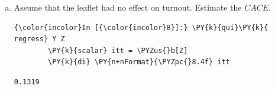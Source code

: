 \documentclass[11pt,notitlepage]{article}\usepackage[]{graphicx}\usepackage[]{color}
\makeatletter
\newenvironment{kframe}{%
 \def\at@end@of@kframe{}%
 \ifinner\ifhmode%
  \def\at@end@of@kframe{\end{minipage}}%
  \begin{minipage}{\columnwidth}%
 \fi\fi%
 \def\FrameCommand##1{\hskip\@totalleftmargin \hskip-\fboxsep
 \colorbox{shadecolor}{##1}\hskip-\fboxsep
     \hskip-\linewidth \hskip-\@totalleftmargin \hskip\columnwidth}%
 \MakeFramed {\advance\hsize-\width
   \@totalleftmargin\z@ \linewidth\hsize
   \@setminipage}}%
 {\par\unskip\endMakeFramed%
 \at@end@of@kframe}
\newenvironment{knitrout}{}{} %
\makeatother
\begin{document}
\begin{enumerate}[a)]
\begin{knitrout}
\begin{kframe}
\begin{Verbatim}[commandchars=\\\{\}]
    \end{Verbatim}

    \begin{Verbatim}[commandchars=\\\{\}]
{\color{incolor}In [{\color{incolor}6}]:} \PY{c+c1}{//}\PY{c+c1}{ }\PY{c+c1}{i}\PY{c+c1}{t}\PY{c+c1}{t}
        \PY{k}{di} \PY{n+nFormat}{\PYZpc{}8.4f} \PY{n+nf}{el}(\PY{n+nf}{r}(b),\PY{l+m}{1},\PY{l+m}{1})
\end{Verbatim}

    \begin{Verbatim}[commandchars=\\\{\}]
  0.1319

    \end{Verbatim}

    \begin{Verbatim}[commandchars=\\\{\}]
{\color{incolor}In [{\color{incolor}7}]:} \PY{c+c1}{//}\PY{c+c1}{ }\PY{c+c1}{p}\PY{c+c1}{.}\PY{c+c1}{v}\PY{c+c1}{a}\PY{c+c1}{l}\PY{c+c1}{u}\PY{c+c1}{e}\PY{c+c1}{.}\PY{c+c1}{t}\PY{c+c1}{w}\PY{c+c1}{o}\PY{c+c1}{s}\PY{c+c1}{i}\PY{c+c1}{d}\PY{c+c1}{e}\PY{c+c1}{d}
        \PY{k}{di} \PY{n+nFormat}{\PYZpc{}8.0f} \PY{n+nf}{el}(\PY{n+nf}{r}(p),\PY{l+m}{1},\PY{l+m}{1})
\end{Verbatim}

    \begin{Verbatim}[commandchars=\\\{\}]
       0
    \end{Verbatim}
\end{kframe}
\end{knitrout}

\item Assume that the leaflet had no effect on turnout. Estimate the $CACE$.
\begin{knitrout}
\color{fgcolor}\begin{kframe}
    \begin{Verbatim}[commandchars=\\\{\}]
{\color{incolor}In [{\color{incolor}8}]:} \PY{k}{qui}\PY{k}{ regress} Y Z
        \PY{k}{scalar} itt = \PYZus{}b[Z]
        \PY{k}{di} \PY{n+nFormat}{\PYZpc{}8.4f} itt
\end{Verbatim}

    \begin{Verbatim}[commandchars=\\\{\}]
  0.1319
    \end{Verbatim}


\end{kframe}
\end{knitrout}
\end{enumerate}
\end{document}
